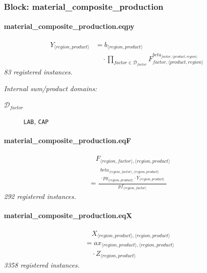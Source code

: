\documentclass[11pt]{article}
\begin{document}
\subsubsection*{Block: material\_composite\_production}
\paragraph{material\_composite\_production.eqpy}
\begin{align*}
Y_{\langle region, product\rangle} &= b_{\langle region, product\rangle}\\
&\quad {}\cdot \prod_{factor \in \mathcal{D}_{factor}} F_{factor,\langle product, region\rangle}^{beta_{factor,\langle product, region\rangle}}
\end{align*}
\noindent\emph{83 registered instances.}\par
\noindent\emph{Internal sum/product domains:}\par
\begin{description}
\item[\(\mathcal{D}_{factor}\)] \texttt{LAB}, \texttt{CAP}
\end{description}
\paragraph{material\_composite\_production.eqF}
\begin{align*}
&\quad F_{\langle region, factor\rangle,\langle region, product\rangle}\\
&= \frac{\begin{aligned}
beta_{\langle region, factor\rangle,\langle region, product\rangle}\\
{}\cdot py_{\langle region, product\rangle} \cdot Y_{\langle region, product\rangle}
\end{aligned}}{pf_{\langle region, factor\rangle}}
\end{align*}
\noindent\emph{292 registered instances.}\par
\paragraph{material\_composite\_production.eqX}
\begin{align*}
&\quad X_{\langle region, product\rangle,\langle region, product\rangle}\\
&= ax_{\langle region, product\rangle,\langle region, product\rangle}\\
&\quad {}\cdot Z_{\langle region, product\rangle}
\end{align*}
\noindent\emph{3358 registered instances.}\par
\end{document}
